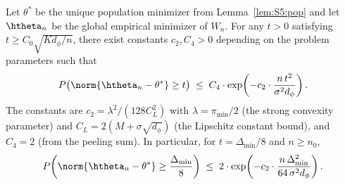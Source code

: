 \begin{lemma}
\label{lem:S5:emp}
Let $\theta^*$ be the unique population minimizer from
Lemma~\ref{lem:S5:pop} and let $\htheta_n$ be the global empirical
minimizer of $W_n$.  For any $t>0$ satisfying
$t\ge C_0\sqrt{K d_\phi/n}$, there exist constants
$c_2,C_4>0$ depending on the problem parameters such that
\begin{equation}
P\bigl(\norm{\htheta_n-\theta^*}\ge t\bigr)
\;\le\; C_4\cdot\exp\!\left(-c_2\cdot\frac{n\,t^2}{\sigma^2 d_\phi}\right).
\label{eq:S5:lem2_bound}
\end{equation}
The constants are $c_2=\lambda^2/(128 C_L^2)$ with
$\lambda=\pi_{\min}/2$ (the strong convexity parameter) and
$C_L=2(M+\sigma\sqrt{d_\phi})$ (the Lipschitz constant bound), and
$C_4=2$ (from the peeling sum).  In particular, for $t=\Delta_{\min}/8$
and $n\ge n_0$,
\[
P\!\left(\norm{\htheta_n-\theta^*}\ge\frac{\Delta_{\min}}{8}\right)
\;\le\; 2\cdot\exp\!\left(
          -c_2\cdot\frac{n\,\Delta_{\min}^2}{64\,\sigma^2 d_\phi}\right).
\]
\end{lemma}


